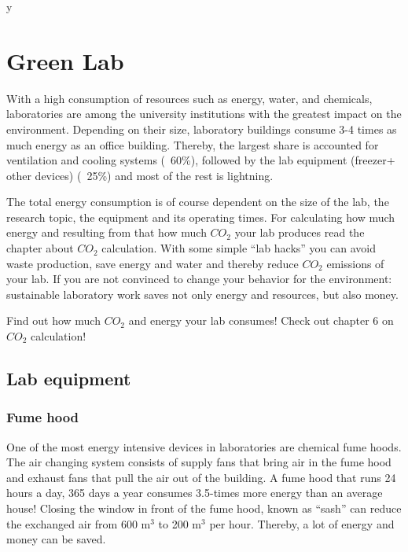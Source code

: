y %

\chapter{Green Lab}\label{chap:lab}

With a high consumption of resources such as energy, water, and chemicals, laboratories are among the university institutions with the greatest impact on the environment. Depending on their size, laboratory buildings consume 3-4 times as much energy as an office building. Thereby, the largest share is accounted for ventilation and cooling systems (~60\%), followed by the lab equipment (freezer+ other devices) (~25\%) and most of the rest is lightning. 

The total energy consumption is of course dependent on the size of the lab, the research topic, the equipment and its operating times. For calculating how much energy and resulting from that how much $CO_2$ your lab produces read the chapter about $CO_{2}$ calculation. 
With some simple “lab hacks” you can avoid waste production, save energy and water and thereby reduce $CO_{2}$ emissions of your lab. 
If you are not convinced to change your behavior for the environment: sustainable laboratory work saves not only energy and resources, but also money.

\begin{suggest}{Find out how much $CO_2$ and energy your lab consumes!}
	Check out chapter 6 on $CO_2$ calculation!
\end{suggest}

\section{Lab equipment}

\subsection{Fume hood}
One of the most energy intensive devices in laboratories are chemical fume hoods. The air changing system consists of supply fans that bring air in the fume hood and exhaust fans that pull the air out of the building.  A fume hood that runs 24 hours a day, 365 days a year consumes 3.5-times more energy than an average house! Closing the window in front of the fume hood, known as “sash” can reduce the exchanged air from 600 m$^{3}$ to 200 m$^{3}$ per hour. Thereby, a lot of energy and money can be saved.

